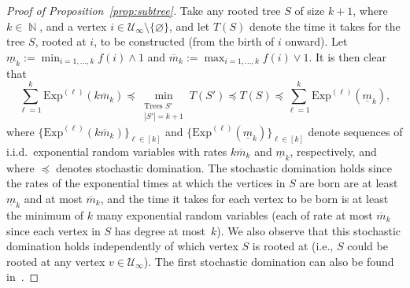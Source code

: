 \documentclass[11pt]{article}
\numberwithin{equation}{section}
\DeclareMathOperator{\N}{\mathbb{N}} %
\newcommand{\be}{\begin{equation}}
\newcommand{\ee}{\end{equation}}
\def\cU{{\mathcal U}}
\theoremstyle{definition}
\begin{document}
\begin{proof}[Proof of Proposition~\ref{prop:subtree}]
Take any rooted tree $S$ of size $k+1$, where $k\in\N$, and a vertex $i\in\cU_\infty\setminus\{\varnothing\}$, and let $T(S)$ denote the time it takes for the tree $S$, rooted at $i$, to be constructed (from the birth of $i$ onward). Let $\underline m_k:=\min_{i=1,\ldots, k}f(i)\wedge 1$ and $\overline m_k:=\max_{i=1,\ldots, k}f(i) \vee 1$. It is then clear that
    \be \label{eq:stochdom}
    \sum_{\ell=1}^k\mathrm{Exp}^{(\ell)}(k\overline m_k)\preceq \min_{\substack{\text{Trees }S'\\ |S'|=k+1}}T(S')\preceq T(S)\preceq \sum_{\ell=1}^k \mathrm{Exp}^{(\ell)}(\underline m_k),
    \ee 
    where $\{\mathrm{Exp}^{(\ell)}(k\overline m_k)\}_{\ell\in[k]}$ and $\{\mathrm{Exp}^{(\ell)}(\underline m_k)\}_{\ell\in[k]}$ denote sequences of i.i.d.\ exponential random variables with rates $k\overline m_k$ and $\underline m_k$, respectively, and where $\preceq$ denotes stochastic domination. 
    The stochastic domination holds since the rates of the exponential times at which the vertices in $S$ are born are at least $\underline m_k$ and at most $\overline m_k$, and the time it takes for each vertex to be born is at least the minimum of $k$ many exponential random variables (each of rate at most $\overline m_k$ since each vertex in $S$ has degree at most~$k$). We also observe that this stochastic domination holds  independently of which vertex $S$ is rooted at (i.e., $S$ could be rooted at any vertex $v\in \cU_\infty$). The first stochastic domination can also be found in~\cite[Lemma $5.6$]{oliveira2005connectivity}.


\end{proof}
\end{document}

